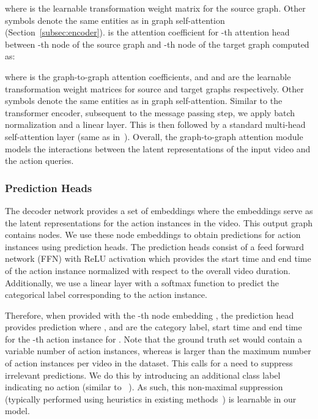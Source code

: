 \documentclass[10pt,twocolumn,letterpaper]{article}
\begin{document}
where  is the learnable transformation weight matrix for the source graph.
Other symbols denote the same entities as in graph self-attention (Section~\ref{subsec:encoder}).
 is the attention coefficient for -th attention head between -th node of the source graph and -th node of the target graph computed as:

where  is the graph-to-graph attention coefficients, and
 and
 are the learnable transformation weight matrices for source and target graphs respectively. 
Other symbols denote the same entities as in graph self-attention.
Similar to the transformer encoder, subsequent to the message passing step, we apply batch normalization and a linear layer. This is then followed by a standard multi-head self-attention layer (same as in~\cite{vaswani2017attention}). 
Overall, the graph-to-graph attention module models the interactions between the latent representations of the input video and the action queries. 




\subsubsection{Prediction Heads} \label{subsec:ffn}
The decoder network provides a set of embeddings where the embeddings serve as the latent representations for the action instances in the video. 
This output graph  contains  nodes. We use these  node embeddings to obtain predictions for  action instances using prediction heads.  
The prediction heads consist of a feed forward network (FFN) with ReLU activation which provides the start time and end time of the action instance normalized with respect to the overall video duration. Additionally, we use a linear layer with a softmax function to predict the categorical label corresponding to the action instance. 

Therefore, when provided with the -th node embedding , the prediction head provides prediction  where ,  and  are the category label, start time and end time for the -th action instance for . Note that the ground truth set  would contain a variable number of action instances, whereas  is larger than the maximum number of action instances per video in the dataset. This calls for a need to suppress irrelevant predictions. We do this by introducing an additional class label  indicating no action (similar to ~\cite{carion2020end}). As such, this non-maximal suppression (typically performed using heuristics in existing methods~\cite{chao2018rethinking}) is learnable in our model.
\end{document}
